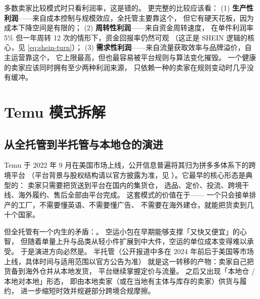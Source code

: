 \begin{insight}
多数卖家比较模式时只看利润率，这是错的。
更完整的比较应该看：
(1) \textbf{生产性利润}——来自成本控制与规模效应，全托管主要靠这个，
但它有硬天花板，因为成本下降空间是有限的；
(2) \textbf{周转性利润}——来自资金周转速度，
在单件利润率 5\% 但一年周转 12 次的情形下，资金回报率仍然可观
（这正是 SHEIN 逻辑的核心，见 \cref{eq:shein-turn}）；
(3) \textbf{需求性利润}——来自流量获取效率与品牌溢价，自主运营靠这个，
它上限最高，但也最容易被平台规则与算法变化摧毁。
一个健康的卖家应该同时拥有至少两种利润来源，
只依赖一种的卖家在规则变动时几乎没有缓冲。
\end{insight}

\section{Temu 模式拆解}
\label{sec:plat-temu}

\subsection{从全托管到半托管与本地仓的演进}

Temu 于 2022 年 9 月在美国市场上线，公开信息普遍将其归为拼多多体系下的跨境平台
（平台背景与股权结构请以官方披露为准，见 \cite{temu_about}）。它最早的核心形态是典型的：
卖家只需要把货送到平台在国内的集货仓，
选品、定价、投流、跨境干线、海外履约、售后全部由平台完成。
这套模式的价值在于——
一个只会接单排产的工厂，不需要懂英语、不需要懂广告、
不需要在海外建仓，就能把货卖到几十个国家。

但全托管有一个内生的矛盾：。
空运小包在早期能够支撑「又快又便宜」的心智，
但随着单量上升与品类从轻小件扩展到中大件，空运的单位成本变得难以承受。
于是演进方向必然是。
半托管（公开报道中多在 2024 年前后于美国等市场上线，具体时间与适用范围以官方公告为准）
就是这一转移的产物：卖家自己把货备到海外仓并从本地发货，
平台继续掌握定价与流量。
之后又出现「本地仓 / 本地对本地」形态，
即由本地卖家（或在当地有主体与库存的卖家）供货与履约，
进一步缩短时效并规避部分跨境合规摩擦。

